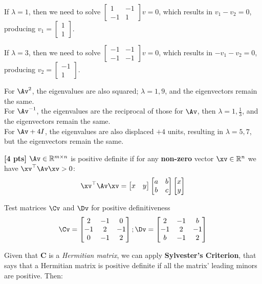 \documentclass[11pt,addpoints,answers]{exam}
\numberwithin{equation}{section} %
\numberwithin{figure}{section} %
\numberwithin{table}{section} %
\newcommand{\twomat}[4]{\begin{bmatrix} #1 & #2 \\ #3 & #4 \end{bmatrix}}
\newcommand{\twovec}[2]{\begin{bmatrix} #1 \\ #2 \end{bmatrix}}
\begin{document}
\begin{questions}
\begin{tcolorbox}[fit, height=6cm, width=\textwidth, blank, borderline={0.5pt}{-2pt}, nobeforeafter]
        If $\lambda = 1$, then we need to solve $\twomat{1}{-1}{-1}{1} v = 0$, which results in $v_1 - v_2 = 0$, producing $v_1 = \twovec{1}{1}$.

        If $\lambda = 3$, then we need to solve $\twomat{-1}{-1}{-1}{-1} v = 0$, which results in $-v_1 - v_2 = 0$, producing $v_2 = \twovec{-1}{1}$.

        For $\Av^2$, the eigenvalues are also squared; $\lambda = 1, 9$, and the eigenvectors remain the same.\\

        For $\Av^{-1}$, the eigenvalues are the reciprocal of those for $\Av$, then $\lambda = 1, \frac{1}{3}$, and the eigenvectors remain the same.\\

        For $\Av + 4I$, the eigenvalues are also displaced $+4$ units, resulting in $\lambda = 5, 7$, but the eigenvectors remain the same.
    \end{tcolorbox}

    \question \textbf{[4 pts]}  $\Av \in \mathbb{R}^{m \times n}$ is positive definite if for any \textbf{non-zero} vector $\xv \in \mathbb{R}^{n}$  we have $\xv^\top \Av \xv > 0$:
    \begin{align*}
        \xv^\top \Av \xv = \begin{bmatrix}
            x & y
        \end{bmatrix} \begin{bmatrix}
            a & b \\ b & c
        \end{bmatrix}
        \begin{bmatrix}
            x \\ y
        \end{bmatrix}
    \end{align*}

    Test matrices $\Cv$ and $\Dv$ for positive definitiveness
    \begin{align*}
        \Cv=\begin{bmatrix}
                 2 & -1 & 0 \\
                 -1 & 2 & -1 \\
                 0 & -1 & 2
                \end{bmatrix};
        \Dv=\begin{bmatrix}
                 2 & -1 & b \\
                 -1 & 2 & -1 \\
                 b & -1 & 2
                \end{bmatrix}
    \end{align*}
    \begin{tcolorbox}[fit,height=8cm, width=\textwidth, blank, borderline={0.5pt}{-2pt}, valign=center, nobeforeafter]
        Given that \textbf{C} is a \textit{Hermitian matrix}, we can apply \textbf{Sylvester's Criterion}, that says that a Hermitian matrix is positive definite if all the matrix' leading minors are positive. Then:\\


\end{tcolorbox}
\end{questions}
\end{document}
